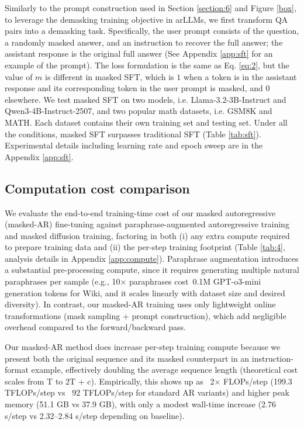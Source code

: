 Similarly to the prompt construction used in Section \ref{section:6} and Figure \ref{box}, to leverage the demasking training objective in arLLMs, we first transform QA pairs into a demasking task. Specifically, the user prompt consists of the question, a randomly masked answer, and an instruction to recover the full answer; the assistant response is the original full answer (See Appendix \ref{app:sft} for an example of the prompt). The loss formulation is the same as Eq. \ref{eq:2}, but the value of $m$ is different in masked SFT, which is $1$ when a token is in the assistant response and its corresponding token in the user prompt is masked, and $0$ elsewhere. We test masked SFT on two models, i.e. Llama-3.2-3B-Instruct and Qwen3-4B-Instruct-2507, and two popular math datasets, i.e. GSM8K and MATH. Each dataset contains their own training set and testing set. Under all the conditions, masked SFT surpasses traditional SFT (Table \ref{tab:sft}). Experimental details including learning rate and epoch sweep are in the Appendix \ref{app:sft}.





\subsection{Computation cost comparison}


We evaluate the end-to-end training-time cost of our masked autoregressive (masked-AR) fine-tuning against paraphrase-augmented autoregressive training and masked diffusion training, factoring in both (i) any extra compute required to prepare training data and (ii) the per-step training footprint (Table \ref{tab:4}, analysis details in Appendix \ref{app:compute}). Paraphrase augmentation introduces a substantial pre-processing compute, since it requires generating multiple natural paraphrases per sample (e.g., 10× paraphrases cost~0.1M GPT-o3-mini generation tokens for Wiki, and it scales linearly with dataset size and desired diversity). In contrast, our masked-AR training uses only lightweight online transformations (mask sampling + prompt construction), which add negligible overhead compared to the forward/backward pass. 

Our masked-AR method does increase per-step training compute because we present both the original sequence and its masked counterpart in an instruction-format example, effectively doubling the average sequence length (theoretical cost scales from T to 2T + c). Empirically, this shows up as ~2× FLOPs/step (199.3 TFLOPs/step vs ~92 TFLOPs/step for standard AR variants) and higher peak memory (51.1 GB vs 37.9 GB), with only a modest wall-time increase (2.76 s/step vs 2.32–2.84 s/step depending on baseline). 

